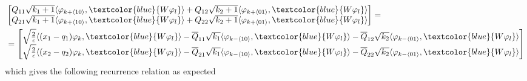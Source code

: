 \begin{align}
  \begin{split}
  &\begin{bmatrix}
    Q_{11} \sqrt{k_{1} + 1} \langle \varphi_{k + \langle 10 \rangle},
    \textcolor{blue}{W\varphi_l} \rangle
   +
   Q_{12} \sqrt{k_{2} + 1} \langle \varphi_{k + \langle 01 \rangle},
   \textcolor{blue}{W\varphi_l} \rangle
   \\
  Q_{21} \sqrt{k_{1} + 1} \langle \varphi_{k + \langle 10 \rangle},
  \textcolor{blue}{W\varphi_l} \rangle
  +
   Q_{22} \sqrt{k_{2} + 1} \langle \varphi_{k + \langle 01 \rangle},
 \textcolor{blue}{W\varphi_l} \rangle
 \end{bmatrix}
  =
  \\
  &
  =\begin{bmatrix}
    \sqrt{\frac{2}{\epsilon}}\langle(x_1 - q_1)\varphi_k,
    \textcolor{blue}{W\varphi_l}\rangle
    -
    \overline{Q}_{11} \sqrt{k_{1}}\langle \varphi_{k - \langle 10 \rangle},
    \textcolor{blue}{W\varphi_l}\rangle
   -
     \overline{Q}_{12} \sqrt{k_{2}}\langle \varphi_{k - \langle 01 \rangle},
    \textcolor{blue}{W\varphi_l}\rangle
  \\
    \sqrt{\frac{2}{\epsilon}}\langle(x_2 - q_2)\varphi_k,
    \textcolor{blue}{W\varphi_l}\rangle
    -
    \overline{Q}_{21} \sqrt{k_{1}} \langle\varphi_{k - \langle 10 \rangle},
   \textcolor{blue}{W\varphi_l}\rangle
   -
     \overline{Q}_{22} \sqrt{k_{2}} \langle \varphi_{k - \langle 01 \rangle},
  \textcolor{blue}{W\varphi_l}\rangle
  \end{bmatrix}
  \end{split}
\end{align}
which gives the following recurrence relation as expected
